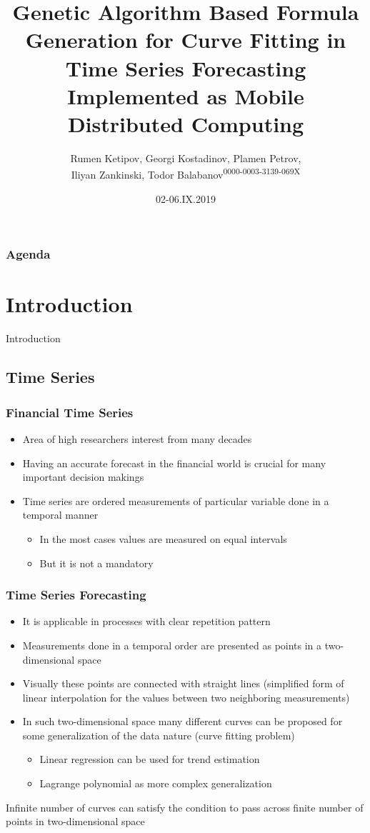 \documentclass{beamer}
\title[High Performance Conference, September 02-06, 2019, Borovets, Bulgaria]{
	Genetic Algorithm Based Formula Generation for Curve Fitting in Time Series Forecasting Implemented as Mobile Distributed Computing
}
\author{Rumen Ketipov, Georgi Kostadinov, Plamen Petrov,\\ Iliyan Zankinski, Todor Balabanov\textsuperscript{0000-0003-3139-069X}}
\date{02-06.IX.2019}
\institute[IICT-BAS, HPC'19] {
	Institute of Information and Communication Technologies \\ 
	Bulgarian Academy of Sciences \\
	\medskip
	\textit{todorb@iinf.bas.bg}
}
\begin{document}
\begin{frame}
\titlepage
\end{frame}

\begin{frame}
\frametitle{Agenda}
\tableofcontents
\end{frame}

\section{Introduction}

\begin{frame}
\center \huge{Introduction}
\end{frame}

\subsection{Time Series}

\begin{frame}
\frametitle{Financial Time Series}
\begin{itemize}
	\item Area of high researchers interest from many decades
	\item Having an accurate forecast in the financial world is crucial for many important decision makings
	\item Time series are ordered measurements of particular variable done in a temporal manner
	\begin{itemize}
		\item In the most cases values are measured on equal intervals
		\item But it is not a mandatory 
	\end{itemize}
\end{itemize}
\end{frame}

\begin{frame}
\frametitle{Time Series Forecasting}
\begin{itemize}
	\item It is applicable in processes with clear repetition pattern
	\item Measurements done in a temporal order are presented as points in a two-dimensional space
	\item Visually these points are connected with straight lines (simplified form of linear interpolation for the values between two neighboring measurements)
	\item In such two-dimensional space many different curves can be proposed for some generalization of the data nature (curve fitting problem)
	\begin{itemize}
		\item Linear regression can be used for trend estimation
		\item Lagrange polynomial as more complex generalization
	\end{itemize}
\end{itemize}
{\color{red} Infinite number of curves can satisfy the condition to pass across finite number of points in two-dimensional space}
\end{frame}
\end{document}
